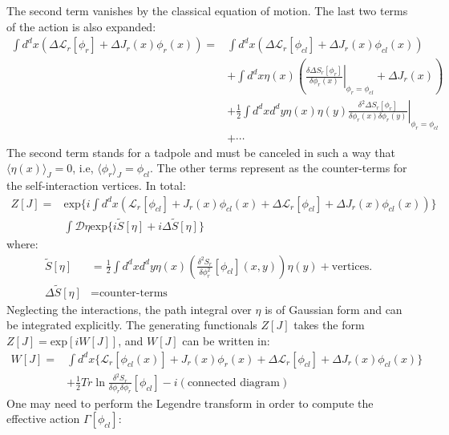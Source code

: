 \documentclass[fleqn]{article}
\begin{document}
The second term vanishes by the classical equation of motion. The last two terms of the action is also expanded:
\begin{align}
\int d^{d}x (\Delta \mathcal{L}_r[\phi_r]  + \Delta J_{r}(x)\phi_{r}(x))  = &\int d^{d}x (\Delta \mathcal{L}_r[\phi_{cl}]  + \Delta J_{r}(x)\phi_{cl}(x)) \nonumber \\ 
&+ \int d^{d}x \eta(x) (\left.\frac{\delta \Delta S_{r}[\phi_{r}]}{\delta \phi_{r}(x)} \right|_{\phi_{r} = \phi_{cl}} + \Delta J_{r}(x) ) \nonumber  \\
& + \frac{1}{2} \int d^{d}x d^{d}y \eta (x)\eta (y) \left. \frac{\delta^{2} \Delta S_{r}[\phi_{r}]}{\delta \phi_{r}(x) \delta \phi_{r} (y)} \right|_{\phi_{r} = \phi_{cl}} \nonumber \\
&+ \cdots
\end{align}
The second term stands for a tadpole and must be canceled in such a way that $\langle \eta(x) \rangle _{J} = 0$, i.e, $\langle \phi _{r}\rangle _{J} = \phi _{cl}$. The other terms represent as the counter-terms for the self-interaction vertices. In total:
\begin{align}
Z[J] = &\text{exp} \lbrace i\int d^{d}x  (\mathcal{L}_r[\phi_{cl}]  + J_{r}(x)\phi_{cl}(x) +\Delta \mathcal{L}_r[\phi_{cl}]  + \Delta J_{r}(x)\phi_{cl}(x) )\rbrace   \nonumber \\
& \int \mathcal{D} \eta \text{exp} \lbrace  i\tilde{S}[\eta] + i\Delta \tilde{S}[\eta]  \rbrace  
\end{align}
where:
\begin{align}
\tilde{S}[\eta] & = \frac{1}{2} \int d^{d}x d^{d}y  \eta (x) (\frac{\delta ^{2} S_{r}}{\delta \phi_{r}^{2}}[\phi_{cl}](x,y))\eta(y) + \text{vertices.} \\
\Delta \tilde{S}[\eta] & = \text{counter-terms}
\end{align}
Neglecting the interactions, the path integral over $\eta$ is of Gaussian form and can be integrated explicitly. The generating functionals $Z[J]$ takes the form $Z[J] = \text{exp} [iW[J]]$, and $W[J]$ can be written in:
\begin{align}
W[J] = &\int d^{d}x \lbrace \mathcal{L}_{r}[\phi _{cl}(x)] + J_{r}(x)\phi_{r}(x) + \Delta \mathcal{L}_{r}[\phi_{cl}] + \Delta J_{r}(x) \phi _{cl}(x) \rbrace \nonumber \\
& + \frac{1}{2} Tr \ln \frac{\delta ^{2} S_{r}}{\delta \phi_{r}\delta \phi_{r}} [\phi_{cl}] - i(\text{connected diagram})
\end{align}
One may need to perform the Legendre transform  in order to compute the effective action $\Gamma[\phi_{cl}]$:
\end{document}
